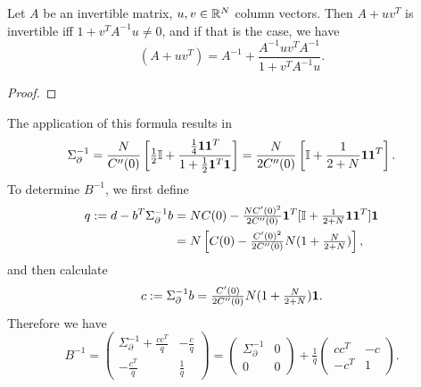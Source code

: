 \begin{lemma}
	Let \(A\) be an invertible matrix, \(u,v\in\mathbb{R}^N\) column vectors.
	Then \(A+ uv^T\) is invertible iff \(1+v^T A^{-1}u \neq 0\), and if that is
	the case, we have
	\[
		(A+uv^T) = A^{-1} + \frac{A^{-1}u v^T A^{-1}}{1+v^T A^{-1}u}.
	\]
\end{lemma}
\begin{proof}
\end{proof}

The application of this formula results in
\begin{equation}\label{eq: sigma_partial inverse}
	\Sigma_\partial^{-1}
	= \frac{N}{C''(0)}\left[
		\tfrac12\mathbb{I} + \frac{\tfrac14\mathbf{1}\mathbf{1}^T}{1+\tfrac12\mathbf{1}^T\mathbf{1}}
	\right]
	= \frac{N}{2C''(0)}\left[
		\mathbb{I} + \frac{1}{2+N}\mathbf{1}\mathbf{1}^T
	\right].
\end{equation}
To determine \(B^{-1}\), we first define
\begin{align*}
	q := d - b^T \Sigma_\partial^{-1}b
	&= NC(0) - \tfrac{NC'(0)^2}{2C''(0)}\mathbf{1}^T
	[\mathbb{I}+\tfrac1{2+N}\mathbf{1}\mathbf{1}^T]\mathbf{1}\\
	&= N\left[
		C(0) - \tfrac{C'(0)^2}{2C''(0)}
		N( 1+\tfrac{N}{2+N} )
	\right],
\end{align*}
and then calculate
\begin{equation}\label{eq: definition of c=sigma_partial^{-1} b}
	c:=\Sigma_\partial^{-1}b
	= \tfrac{\sqC'(0)}{2\sqC''(0)}\dimension( 1 + \tfrac{\dimension}{2+\dimension} )\ones.
\end{equation}
Therefore we have
\begin{equation}\label{eq: inv B split}
	B^{-1} = \begin{pmatrix}
		\Sigma_\partial^{-1}	+ \frac{cc^T}{q} & - \frac{c}{q}\\
		-\frac{c^T}{q} & \frac1q
	\end{pmatrix}
	= \begin{pmatrix}
		\Sigma_\partial^{-1} & 0 \\
		0 & 0
	\end{pmatrix}
	+ \tfrac1q \begin{pmatrix}
		cc^T & -c\\
		-c^T & 1
	\end{pmatrix}.
\end{equation}

